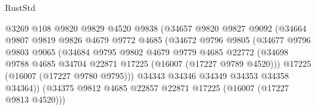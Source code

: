 \begin{lexlean}{RustStd}
\begin{coremodule}
                                    @3269
                                    @108
                                    @9820
                                    @9829
                                    @4520
                                    @9838
                                    (@34657
                                      @9820
                                      @9827
                                      @9092
                                      (@34664
                                        @9807
                                        @9819
                                        @9826
                                        @4679
                                        @9772
                                        @4685
                                        (@34672
                                          @9796
                                          @9805
                                          (@34677
                                            @9796
                                            @9803
                                            @9065
                                            (@34684
                                              @9795
                                              @9802
                                              @4679
                                              @9779
                                              @4685
                                              @22772
                                              (@34698
                                                @9788
                                                @4685
                                                @34704
                                                @22871
                                                @17225
                                                (@16007 (@17227 @9789 @4520)))
                                              @17225
                                              (@16007 (@17227 @9780 @9795)))
                                            @34343
                                            @34346
                                            @34349
                                            @34353
                                            @34358
                                            @34364))
                                        (@34375
                                          @9812
                                          @4685
                                          @22857
                                          @22871
                                          @17225
                                          (@16007 (@17227 @9813 @4520)))

\end{coremodule}
\end{lexlean}
